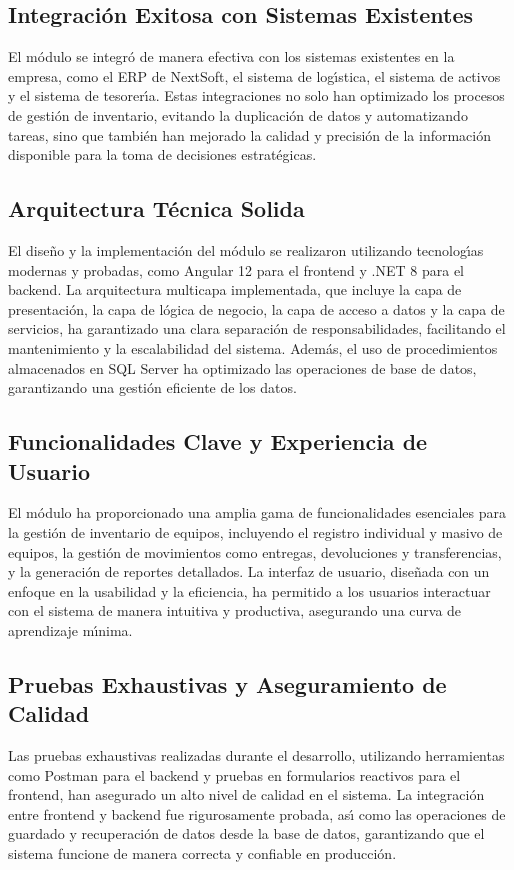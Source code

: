 \documentclass[stu, 12pt, letterpaper, donotrepeattitle, floatsintext, natbib]{apa7}
\begin{document}
\subsection{Integraci\'on Exitosa con Sistemas Existentes}
El m\'odulo se integr\'o de manera efectiva con los sistemas existentes en la empresa, como el ERP de NextSoft, el sistema de log\'{\i}stica, el sistema de activos y el sistema de tesorer\'{\i}a. Estas integraciones no solo han optimizado los procesos de gesti\'on de inventario, evitando la duplicaci\'on de datos y automatizando tareas, sino que tambi\'en han mejorado la calidad y precisi\'on de la informaci\'on disponible para la toma de decisiones estrat\'egicas.
\subsection{Arquitectura T\'ecnica Solida}
El dise\~{n}o y la implementaci\'on del m\'odulo se realizaron utilizando tecnolog\'{\i}as modernas y probadas, como Angular 12 para el frontend y .NET 8 para el backend. La arquitectura multicapa implementada, que incluye la capa de presentaci\'on, la capa de l\'ogica de negocio, la capa de acceso a datos y la capa de servicios, ha garantizado una clara separaci\'on de responsabilidades, facilitando el mantenimiento y la escalabilidad del sistema. Adem\'as, el uso de procedimientos almacenados en SQL Server ha optimizado las operaciones de base de datos, garantizando una gesti\'on eficiente de los datos.
\subsection{Funcionalidades Clave y Experiencia de Usuario}
El m\'odulo ha proporcionado una amplia gama de funcionalidades esenciales para la gesti\'on de inventario de equipos, incluyendo el registro individual y masivo de equipos, la gesti\'on de movimientos como entregas, devoluciones y transferencias, y la generaci\'on de reportes detallados. La interfaz de usuario, dise\~{n}ada con un enfoque en la usabilidad y la eficiencia, ha permitido a los usuarios interactuar con el sistema de manera intuitiva y productiva, asegurando una curva de aprendizaje m\'{\i}nima.
\subsection{Pruebas Exhaustivas y Aseguramiento de Calidad}
Las pruebas exhaustivas realizadas durante el desarrollo, utilizando herramientas como Postman para el backend y pruebas en formularios reactivos para el frontend, han asegurado un alto nivel de calidad en el sistema. La integraci\'on entre frontend y backend fue rigurosamente probada, as\'{\i} como las operaciones de guardado y recuperaci\'on de datos desde la base de datos, garantizando que el sistema funcione de manera correcta y confiable en producci\'on.
\end{document}
